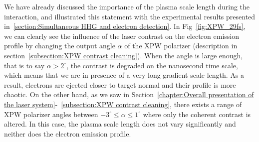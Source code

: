 \noindent We have already discussed the importance of the plasma scale length during the interaction, and illustrated this statement with the experimental results presented in~\ref{section:Simultaneous HHG and electron detection}. In Fig~\ref{fig:XPW_29fs}, we can clearly see the influence of the laser contrast on the electron emission profile by changing the output angle $\alpha$ of the XPW polarizer (description in section~\ref{subsection:XPW contrast cleaning}). When the angle is large enough, that is to say $\alpha >2^{\circ}$, the contrast is degraded on the nanosecond time scale, which means that we are in presence of a very long gradient scale length. As a result, electrons are ejected closer to target normal and their profile is more chaotic. On the other hand, as we saw in Section~\ref{chapter:Overall presentation of the laser system}-~\ref{subsection:XPW contrast cleaning}, there exists a range of XPW polarizer angles between $-3^{\circ}\le \alpha \le1^{\circ}$ where only the coherent contrast is altered. In this case, the plasma scale length does  not vary significantly and neither does the electron emission profile.\\

\\

